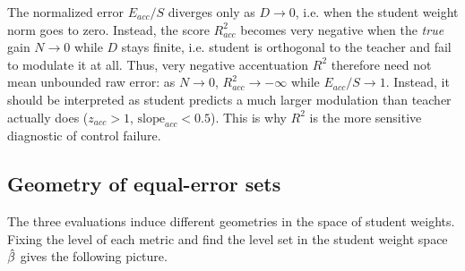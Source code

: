 \begin{remark}
The normalized error $E_{acc}/S$ diverges only as $D\to0$, i.e. when the student weight norm goes to zero. Instead, the score $R^2_{acc}$ becomes very negative when the \emph{true} gain $N\to0$ while $D$ stays finite, i.e. student is orthogonal to the teacher and fail to modulate it at all. 
Thus, very negative accentuation $R^2$ therefore need not mean unbounded raw error: as
$N\to0$, $R^2_{acc}\to-\infty$ while $E_{acc}/S\to1$. 
Instead, it should be interpreted as student predicts a much larger modulation than teacher actually does ($z_{acc}>1$, $\mathrm{slope}_{acc}<0.5$).  
This is why $R^2$ is the more sensitive diagnostic of control failure.
\end{remark}

\subsection{Geometry of equal-error sets}
\label{sec:app-iso-error-geometry}

The three evaluations induce different geometries in the space of student weights.  
Fixing the level of each metric and find the level set in the student weight space $\hat{\beta}$ gives the following picture.

